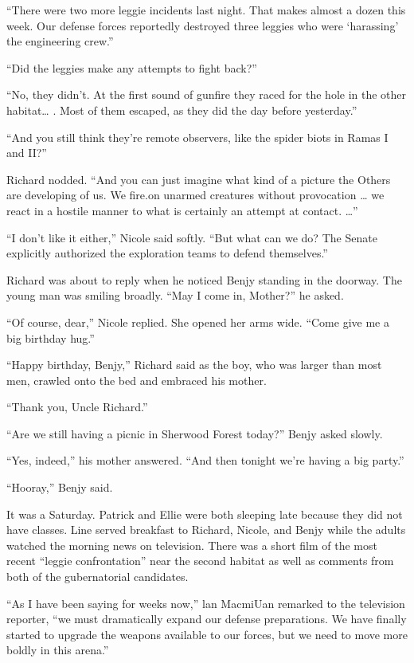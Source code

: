 \documentclass[]{article}
\begin{document}
{“There were two more leggie incidents last night.  That makes almost a dozen this week.  Our defense forces reportedly destroyed three leggies who were ‘harassing’ the engineering crew.”

“Did the leggies make any attempts to fight back?”

“No, they didn’t.  At the first sound of gunfire they raced for the hole in the other habitat… .  Most of them escaped, as they did the day before yesterday.”

“And you still think they’re remote observers, like the spider biots in Ramas I and II?”

Richard nodded.  “And you can just imagine what kind of a picture the Others are developing of us.  We fire.on unarmed creatures without provocation … we react in a hostile manner to what is certainly an attempt at contact.  …”

“I don’t like it either,” Nicole said softly.  “But what can we do? The Senate explicitly authorized the exploration teams to defend themselves.”

Richard was about to reply when he noticed Benjy standing in the doorway.  The young man was smiling broadly.  “May I come in, Mother?” he asked.

“Of course, dear,” Nicole replied.  She opened her arms wide.  “Come give me a big birthday hug.”

“Happy birthday, Benjy,” Richard said as the boy, who was larger than most men, crawled onto the bed and embraced his mother.

“Thank you, Uncle Richard.”

“Are we still having a picnic in Sherwood Forest today?” Benjy asked slowly.

“Yes, indeed,” his mother answered.  “And then tonight we’re having a big party.”

“Hooray,” Benjy said.

It was a Saturday.  Patrick and Ellie were both sleeping late because they did not have classes.  Line served breakfast to Richard, Nicole, and Benjy while the adults watched the morning news on television.  There was a short film of the most recent “leggie confrontation” near the second habitat as well as comments from both of the gubernatorial candidates.

“As I have been saying for weeks now,” lan MacmiUan remarked to the television reporter, “we must dramatically expand our defense preparations.  We have finally started to upgrade the weapons available to our forces, but we need to move more boldly in this arena.”

}
\end{document}
